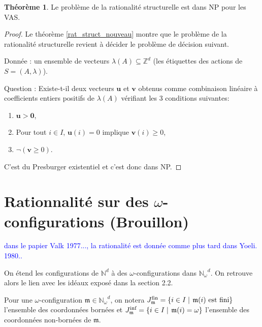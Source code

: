 \documentclass[a4paper,final]{article}
\theoremstyle{definition}
\newtheorem{Theorem}{Théorème}
\let\geq\geqslant
\newcommand{\alain}[1]{\textcolor{blue}{#1}}
\newcommand{\set}[2]{\left\{#1\mathrel{\left|\vphantom{#1}\vphantom{#2}\right.}#2\right\}}
\newcommand{\os}[1]{\left\{\mathinner{#1}\right\}}
\newcommand{\N}{\ensuremath{\mathbb{N}}}
\newcommand{\Z}{\ensuremath{\mathbb{Z}}}
\newcommand{\Nomega}{\ensuremath{\mathbb{N}_\omega}}
\newcommand{\lang}{\ensuremath{\mathcal{L}}}
\newcommand{\vect}[1]{\ensuremath{\mathbf{#1}}}
\newcommand{\Jfin}[1]{J^\text{fin}_{#1}}
\newcommand{\Jinf}[1]{J^\text{inf}_{#1}}
\begin{document}
\begin{Theorem}\label{NP conf_struct_rat}
Le  problème de la rationalité structurelle est dans NP pour les VAS.
\end{Theorem}

\begin{proof}
Le théorème \ref{rat_struct_nouveau} montre que le problème de la rationalité structurelle revient à décider le problème de décision suivant.

Donnée : un ensemble de vecteurs $\lambda(A) \subseteq \Z^d$ (les étiquettes des actions de $S = (A,\lambda)$).

Question : Existe-t-il deux vecteurs $\vect{u}$ et $\vect{v}$ obtenus comme combinaison linéaire à coefficients entiers positifs de $\lambda(A)$ vérifiant les 3 conditions suivantes:
\begin{enumerate}
    \item $\vect{u} > \vect{0}$,
    \item Pour tout $i \in I$, $\vect{u}(i)=0$ implique $\vect{v}(i) \geq 0$,
    \item  $\lnot(\vect{v} \geq 0)$.
\end{enumerate}
C'est du Presburger existentiel et c'est donc dans NP.
\end{proof}



\section{Rationnalité sur des $\omega$-configurations (Brouillon)}
\alain{dans le papier Valk 1977..., la rationalité est donnée comme plus tard dans Yoeli. 1980..}


On étend les configurations de $\N^d$ à des $\omega$-configurations dans $\Nomega^d$.
On retrouve alors le lien avec les idéaux exposé dans la section 2.2.

Pour une $\omega$-configuration $\mathfrak{m} \in \Nomega^d$, on notera $\Jfin{\mathfrak{m}} = \set{i\in I}{\mathfrak{m}(i) \text{ est fini}}$ l'ensemble des coordonnées bornées et  $\Jinf{\mathfrak{m}} = \set{i\in I}{\mathfrak{m}(i)=\omega}$ l'ensemble des coordonnées non-bornées de $\mathfrak{m}$.
\end{document}
